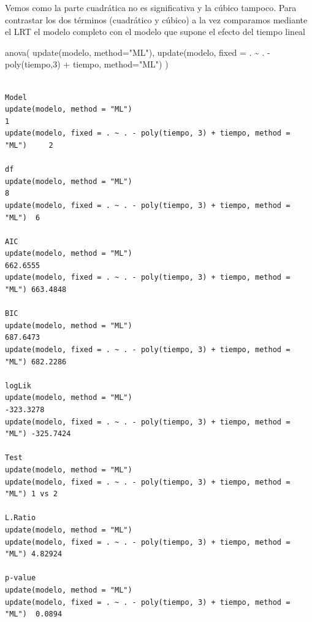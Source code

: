 \documentclass[
]{book}
\newenvironment{Shaded}{\begin{snugshade}}{\end{snugshade}}
\newcommand{\AttributeTok}[1]{\textcolor[rgb]{0.77,0.63,0.00}{#1}}
\newcommand{\DecValTok}[1]{\textcolor[rgb]{0.00,0.00,0.81}{#1}}
\newcommand{\FunctionTok}[1]{\textcolor[rgb]{0.00,0.00,0.00}{#1}}
\newcommand{\NormalTok}[1]{#1}
\newcommand{\SpecialCharTok}[1]{\textcolor[rgb]{0.00,0.00,0.00}{#1}}
\newcommand{\StringTok}[1]{\textcolor[rgb]{0.31,0.60,0.02}{#1}}
\begin{document}
Vemos como la parte cuadrática no es significativa y la cúbico tampoco.
Para contrastar los dos términos (cuadrático y cúbico) a la vez comparamos mediante el LRT el modelo completo con el modelo que supone el efecto del tiempo lineal

\begin{Shaded}
\begin{Highlighting}[]
\FunctionTok{anova}\NormalTok{(}
  \FunctionTok{update}\NormalTok{(modelo, }\AttributeTok{method=}\StringTok{"ML"}\NormalTok{), }
  \FunctionTok{update}\NormalTok{(modelo, }\AttributeTok{fixed =}\NormalTok{ . }\SpecialCharTok{\textasciitilde{}}\NormalTok{ . }\SpecialCharTok{{-}} \FunctionTok{poly}\NormalTok{(tiempo,}\DecValTok{3}\NormalTok{) }\SpecialCharTok{+}\NormalTok{ tiempo, }\AttributeTok{method=}\StringTok{"ML"}\NormalTok{)}
\NormalTok{)}
\end{Highlighting}
\end{Shaded}

\begin{verbatim}
                                                                        Model
update(modelo, method = "ML")                                               1
update(modelo, fixed = . ~ . - poly(tiempo, 3) + tiempo, method = "ML")     2
                                                                        df
update(modelo, method = "ML")                                            8
update(modelo, fixed = . ~ . - poly(tiempo, 3) + tiempo, method = "ML")  6
                                                                             AIC
update(modelo, method = "ML")                                           662.6555
update(modelo, fixed = . ~ . - poly(tiempo, 3) + tiempo, method = "ML") 663.4848
                                                                             BIC
update(modelo, method = "ML")                                           687.6473
update(modelo, fixed = . ~ . - poly(tiempo, 3) + tiempo, method = "ML") 682.2286
                                                                           logLik
update(modelo, method = "ML")                                           -323.3278
update(modelo, fixed = . ~ . - poly(tiempo, 3) + tiempo, method = "ML") -325.7424
                                                                          Test
update(modelo, method = "ML")                                                 
update(modelo, fixed = . ~ . - poly(tiempo, 3) + tiempo, method = "ML") 1 vs 2
                                                                        L.Ratio
update(modelo, method = "ML")                                                  
update(modelo, fixed = . ~ . - poly(tiempo, 3) + tiempo, method = "ML") 4.82924
                                                                        p-value
update(modelo, method = "ML")                                                  
update(modelo, fixed = . ~ . - poly(tiempo, 3) + tiempo, method = "ML")  0.0894
\end{verbatim}
\end{document}
